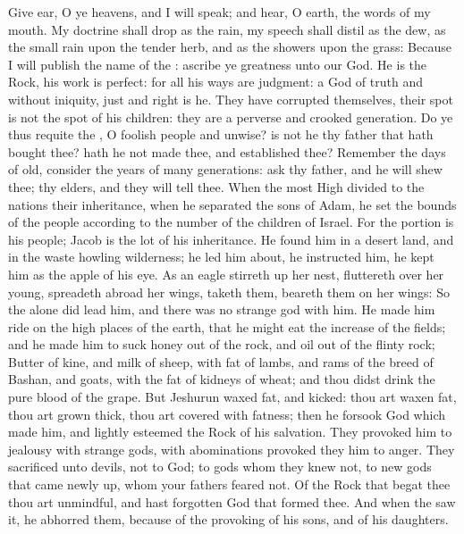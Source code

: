 \begin{biblechapter} %
\verse Give ear, O ye heavens, and I will speak; and hear, O earth, the words of my mouth.
\verse My doctrine shall drop as the rain, my speech shall distil as the dew, as the small rain upon the tender herb, and as the showers upon the grass:
\verse Because I will publish the name of the \LORD: ascribe ye greatness unto our God.
\verse He is the Rock, his work is perfect: for all his ways are judgment: a God of truth and without iniquity, just and right is he.
\verse They have corrupted themselves, their spot is not the spot of his children: they are a perverse and crooked generation.
\verse Do ye thus requite the \LORD, O foolish people and unwise? is not he thy father that hath bought thee? hath he not made thee, and established thee?
\verse Remember the days of old, consider the years of many generations: ask thy father, and he will shew thee; thy elders, and they will tell thee.
\verse When the most High divided to the nations their inheritance, when he separated the sons of Adam, he set the bounds of the people according to the number of the children of Israel.
\verse For the \LORDs portion is his people; Jacob is the lot of his inheritance.
\verse He found him in a desert land, and in the waste howling wilderness; he led him about, he instructed him, he kept him as the apple of his eye.
\verse As an eagle stirreth up her nest, fluttereth over her young, spreadeth abroad her wings, taketh them, beareth them on her wings:
\verse So the \LORD alone did lead him, and there was no strange god with him.
\verse He made him ride on the high places of the earth, that he might eat the increase of the fields; and he made him to suck honey out of the rock, and oil out of the flinty rock;
\verse Butter of kine, and milk of sheep, with fat of lambs, and rams of the breed of Bashan, and goats, with the fat of kidneys of wheat; and thou didst drink the pure blood of the grape.
\verse But Jeshurun waxed fat, and kicked: thou art waxen fat, thou art grown thick, thou art covered with fatness; then he forsook God which made him, and lightly esteemed the Rock of his salvation.
\verse They provoked him to jealousy with strange gods, with abominations provoked they him to anger.
\verse They sacrificed unto devils, not to God; to gods whom they knew not, to new gods that came newly up, whom your fathers feared not.
\verse Of the Rock that begat thee thou art unmindful, and hast forgotten God that formed thee.
\verse And when the \LORD saw it, he abhorred them, because of the provoking of his sons, and of his daughters.

\end{biblechapter}
